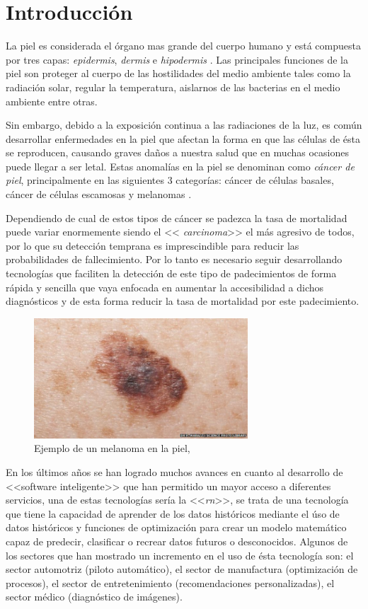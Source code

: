 
\chapter{Introducción}

La piel es considerada el órgano mas grande del cuerpo humano y está compuesta por tres capas: \emph{\gls{epidermis}}, \emph{\gls{dermis}} e \emph{\gls{hipodermis}} \cite{skin_1}. Las principales funciones de la piel son proteger al cuerpo de las hostilidades del medio ambiente tales como la radiación solar,  regular la temperatura, aislarnos de las bacterias en el medio ambiente entre otras.

Sin embargo, debido a la exposición continua a las radiaciones de la luz, es común desarrollar enfermedades en la piel que afectan la forma en que las células de ésta se reproducen, causando graves daños a nuestra salud que en muchas ocasiones puede llegar a ser letal. Estas anomalías en la piel se denominan como \emph{cáncer de piel}, principalmente en las siguientes 3 categorías: cáncer de células basales, cáncer de células escamosas y melanomas \citep{cancer_org}.

Dependiendo de cual de estos tipos de cáncer se padezca la tasa de mortalidad puede variar enormemente siendo el << \emph{carcinoma}>> el más agresivo de todos, por lo que su detección temprana es imprescindible para reducir las probabilidades de fallecimiento. Por lo tanto es necesario seguir desarrollando tecnologías que faciliten la detección de este tipo de padecimientos de forma rápida y sencilla que vaya enfocada en aumentar la accesibilidad a dichos diagnósticos y de esta forma reducir la tasa de mortalidad por este padecimiento.


\begin{figure}[h!]
    \includegraphics[width=80mm, scale = 0.8]{Figuras/skin_cancer_bbc.jpg}
    \centering
    \caption{Ejemplo de un melanoma en la piel, }
    \label{fig:can_jpg}
\end{figure}

En los últimos años se han logrado muchos avances en cuanto al desarrollo de <<software inteligente>> que han permitido un mayor acceso a diferentes servicios, una de estas tecnologías sería la <<\emph{\gls{rn}}>>, se trata de una tecnología que tiene la capacidad de aprender de los datos históricos mediante el úso de datos históricos y funciones de optimización para crear un modelo matemático capaz de predecir, clasificar o recrear datos futuros o desconocidos. Algunos de los sectores que han mostrado un incremento en el uso de ésta tecnología son: el sector automotriz (piloto automático), el sector de manufactura (optimización de procesos), el sector de entretenimiento (recomendaciones personalizadas), el sector médico (diagnóstico de imágenes). 

